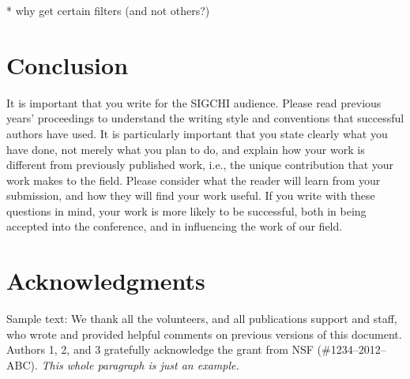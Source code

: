 \documentclass{sigchi}
\begin{document}
* why get certain filters (and not others?)

\section{Conclusion}

It is important that you write for the SIGCHI audience. Please read
previous years' proceedings to understand the writing style and
conventions that successful authors have used. It is particularly
important that you state clearly what you have done, not merely what
you plan to do, and explain how your work is different from previously
published work, i.e., the unique contribution that your work makes to
the field. Please consider what the reader will learn from your
submission, and how they will find your work useful. If you write with
these questions in mind, your work is more likely to be successful,
both in being accepted into the conference, and in influencing the
work of our field.

\section{Acknowledgments}

Sample text: We thank all the volunteers, and all publications support
and staff, who wrote and provided helpful comments on previous
versions of this document. Authors 1, 2, and 3 gratefully acknowledge
the grant from NSF (\#1234--2012--ABC). \textit{This whole paragraph is
  just an example.}

%
%
%
%
%
\balance{}

\balance{}



\end{document}
